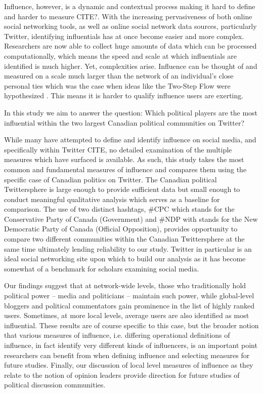 \documentclass[a4paper,12pt]{article}
\begin{document}
Influence, however, is a dynamic and contextual process making it hard to define and harder to measure CITE?. With the increasing pervasiveness of both online social networking tools, as well as online social network data sources, particularly Twitter, identifying influentials has at once become easier and more complex. Researchers are now able to collect huge amounts of data which can be processed computationally, which means the speed and scale at which influentials are identified is much higher. Yet, complexities arise. Influence can be thought of and measured on a scale much larger than the network of an individual's close personal ties which was the case when ideas like the Two-Step Flow were hypothesized \cite{katzlazarsfeld}. This means it is harder to qualify influence users are exerting. 

In this study we aim to answer the question: Which political players are the most influential within the two largest Canadian political communities on Twitter?

While many have attempted to define and identify influence on social media, and specifically within Twitter CITE, no detailed examination of the multiple measures which have surfaced is available. As such, this study takes the most common and fundamental measures of influence and compares them using the specific case of Canadian politics on Twitter. The Canadian political Twittersphere is large enough to provide sufficient data but small enough to conduct meaningful qualitative analysis which serves as a baseline for comparison. The use of two distinct hashtags, \#CPC which stands for the Conservative Party of Canada (Government) and \#NDP with stands for the New Democratic Party of Canada (Official Opposition), provides opportunity to compare two different communities within the Canadian Twittersphere at the same time ultimately lending reliability to our study. Twitter in particular is an ideal social networking site upon which to build our analysis as it has become somewhat of a benchmark for scholars examining social media. 

Our findings suggest that at network-wide levels, those who traditionally hold political power – media and politicians – maintain such power, while global-level bloggers and political commentators gain prominence in the list of highly ranked users. Sometimes, at more local levels, average users are also identified as most influential. These results are of course specific to this case, but the broader notion that various measures of influence, i.e. differing operational definitions of influence, in fact identify very different kinds of influencers, is an important point researchers can benefit from when defining influence and selecting measures for future studies. Finally, our discussion of local level measures of influence as they relate to the notion of opinion leaders provide direction for future studies of political discussion communities.
\end{document}
